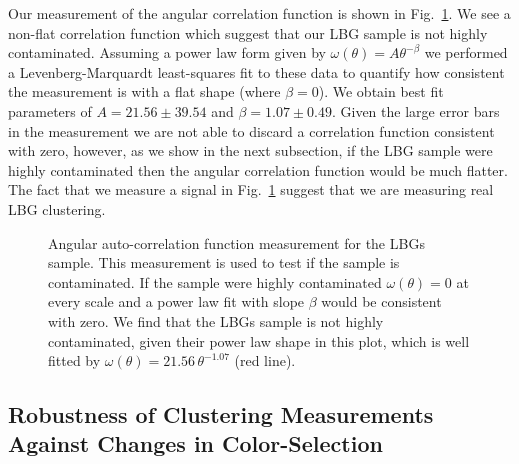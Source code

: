 \documentclass[iop, revtex4]{emulateapj}
\begin{document}
Our measurement of the angular correlation function is shown in Fig.~\ref{fig:omega}. We see a non-flat correlation
 function which suggest that our LBG sample is not highly contaminated.
 Assuming a power law form given by $\omega(\theta)=A\theta^{-\beta}$ we performed a Levenberg-Marquardt
least-squares fit to these data to quantify how consistent the measurement is with a flat shape
(where $\beta=0$). We obtain best fit parameters of $A=21.56\pm39.54$ and $\beta=1.07\pm0.49$. 
Given the large error bars in the measurement we are not able to discard a correlation function consistent 
with zero, however, as we show in the next subsection, if the LBG sample were highly contaminated then the angular correlation function would be much flatter. The fact that we measure a signal in Fig.~\ref{fig:omega} suggest that we are measuring real LBG clustering.

\begin{figure}[t!]
\begin{center}
\caption{\label{fig:omega} Angular auto-correlation function measurement for the LBGs sample. This measurement is used to test if the sample is contaminated. If the sample were highly contaminated $\omega(\theta)=0$ at every scale and a power law fit with slope $\beta$ would be consistent with zero. We find that the LBGs sample is not highly contaminated, given their power law shape in this plot, which is well fitted by $\omega(\theta)=21.56\,\theta^{-1.07}$ (red line).\\}  
\end{center}
\end{figure} 

\subsection{Robustness of Clustering Measurements Against Changes in Color-Selection}

\label{sec:different_selections}
\end{document}
